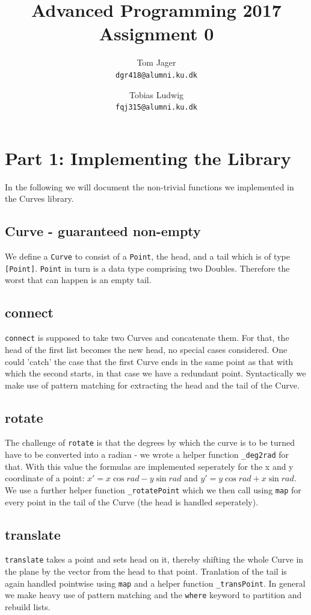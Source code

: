 \documentclass{article}
\title{Advanced Programming 2017\\Assignment 0}
\author{
Tom Jager\\
\texttt{dgr418@alumni.ku.dk}
\and
Tobias Ludwig\\
\texttt{fqj315@alumni.ku.dk}}
\begin{document}
\maketitle

\section*{Part 1: Implementing the Library}

In the following we will document the non-trivial functions we implemented in the
Curves library.

\subsection*{Curve - guaranteed non-empty}
We define a \texttt{Curve} to consist of a \texttt{Point}, the head, and a tail
which is of type \texttt{[Point]}. \texttt{Point} in turn is a data type comprising
two Doubles. Therefore the worst that can happen is an empty tail. 

\subsection*{connect}
\texttt{connect} is supposed to take two Curves and concatenate them. For that, the head
of the first list becomes the new head, no special cases considered. One could
'catch' the case that the first Curve ends in the same point as that with which
the second starts, in that case we have a redundant point. Syntactically we make
use of pattern matching for extracting the head and the tail of the Curve.

\subsection*{rotate}
The challenge of \texttt{rotate} is that the degrees by which the curve is to be turned
have to be converted into a radian - we wrote a helper function \texttt{\_deg2rad}
for that. With this value the formulas are implemented seperately for the x and y
coordinate of a point: $x' = x \cos rad - y \sin rad$ and $y' = y \cos rad + x \sin rad$.
We use a further helper function \texttt{\_rotatePoint} which we then call using
\texttt{map} for every point in the tail of the Curve (the head is handled seperately).

\subsection*{translate}
\texttt{translate} takes a point and sets head on it, thereby shifting the whole
Curve in the plane by the vector from the head to that point. Tranlation of the
tail is again handled pointwise using \texttt{map} and a helper function \texttt{\_transPoint}.
In general we make heavy use of pattern matching and the \texttt{where} keyword
to partition and rebuild lists.
\end{document}
